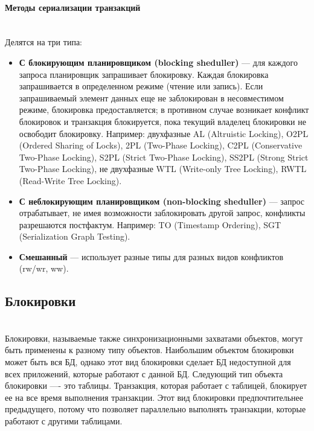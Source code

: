 \paragraph{Методы сериализации транзакций} ~\\

Делятся на три типа:
\begin{itemize}
\item \textbf{С блокирующим планировщиком (blocking sheduller)} — для каждого запроса планировщик запрашивает блокировку. Каждая блокировка запрашивается в определенном режиме (чтение или запись). Если запрашиваемый элемент данных еще не заблокирован в несовместимом режиме, блокировка предоставляется; в противном случае возникает конфликт блокировок и транзакция блокируется, пока текущий владелец блокировки не освободит блокировку. Например: двухфазные AL (Altruistic Locking), O2PL (Ordered Sharing of Locks), 2PL (Two-Phase Locking), C2PL (Conservative Two-Phase Locking), S2PL (Strict Two-Phase Locking), SS2PL (Strong Strict Two-Phase Locking), не двухфазные WTL (Write-only Tree Locking), RWTL (Read-Write Tree Locking).

\item \textbf{С неблокирующим планировщиком (non-blocking sheduller)} — запрос отрабатывает, не имея возможности заблокировать другой запрос, конфликты разрешаются постфактум. Например: TO (Timestamp Ordering), SGT (Serialization Graph Testing).

\item \textbf{Смешанный} — использует разные типы для разных видов конфликтов (rw/wr, ww).\autocite{TransactionalInformationSystems}
\end{itemize}

\subsection{Блокировки} ~\\

Блокировки, называемые также синхронизационными захватами объектов, могут быть применены к разному типу объектов. Наибольшим объектом блокировки может быть вся БД, однако этот вид блокировки сделает БД недоступной для всех приложений, которые работают с данной БД. Следующий тип объекта блокировки —- это таблицы. Транзакция, которая работает с таблицей, блокирует ее на все время выполнения транзакции. Этот вид блокировки предпочтительнее предыдущего, потому что позволяет параллельно выполнять транзакции, которые работают с другими таблицами.

